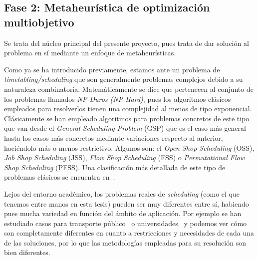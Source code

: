 \subsection{Fase 2: Metaheurística de optimización multiobjetivo} \label{sec:3:metaheurística}
Se trata del núcleo principal del presente proyecto, pues trata de dar solución al problema en sí mediante un enfoque de metaheurísticas.

Como ya se ha introducido previamente, estamos ante un problema de \textit{timetabling/scheduling} que son generalmente problemas complejos debido a su naturaleza combinatoria. 
Matemáticamente se dice que pertenecen al conjunto de los problemas llamados \textit{NP-Duros (NP-Hard)}, pues los algoritmos clásicos empleados para resolverlos tienen una complejidad al menos de tipo exponencial.
Clásicamente se han empleado algoritmos para problemas concretos de este tipo que van desde el \textit{General Scheduling Problem} (GSP) que es el caso más general hasta los casos más concretos mediante variaciones respecto al anterior, haciéndolo más o menos restrictivo.
Algunos son: el \textit{Open Shop Scheduling} (OSS), \textit{Job Shop Scheduling} (JSS), \textit{Flow Shop Scheduling} (FSS) o \textit{Permutational Flow Shop Scheduling} (PFSS). Una clasificación más detallada de este tipo de problemas clásicos se encuentra en~\cite{sota:tesis-doctoral}. 

Lejos del entorno académico, los problemas reales de \textit{scheduling} (como el que tenemos entre manos en esta tesis) pueden ser muy diferentes entre sí, habiendo pues mucha variedad en función del ámbito de aplicación. 
Por ejemplo se han estudiado casos para transporte público~\cite{sota:transporte-publico} o universidades~\cite{sota:universidad} y podemos ver cómo son completamente diferentes en cuanto a restricciones y necesidades de cada una de las soluciones, por lo que las metodologías empleadas para su resolución son bien diferentes.


